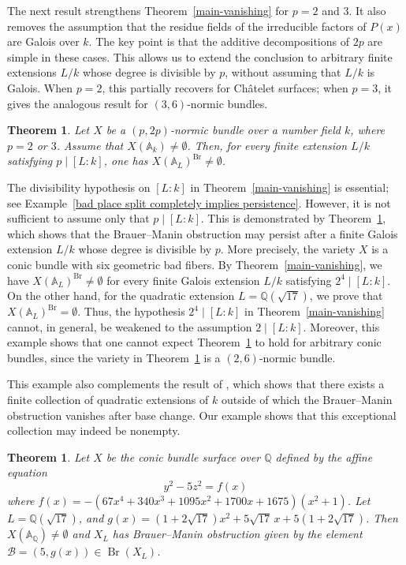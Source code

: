 \documentclass[10pt]{amsart}
\theoremstyle{plain}
\newtheorem{theorem}[thm]{Theorem}
\theoremstyle{definition}
\newcommand{\A}{{\mathbb A}}
\newcommand{\Q}{{\mathbb Q}}
\newcommand{\Br}{\operatorname{Br}}
\begin{document}
The next result strengthens Theorem~\ref{main-vanishing} for \(p=2\) and \(3\).
It also removes the assumption that the residue fields of the irreducible
factors of \(P(x)\) are Galois over \(k\). The key point is that the additive
decompositions of \(2p\) are simple in these cases. This allows us
to extend the conclusion to arbitrary finite extensions \(L/k\) whose degree is
divisible by \(p\), without assuming that \(L/k\) is Galois. When \(p=2\), this
partially recovers \cite[Theorem~1.1]{RW} for Châtelet surfaces; when \(p=3\),
it gives the analogous result for \((3,6)\)-normic bundles.
\begin{theorem}\label{3-6}
Let \(X\) be a \((p,2p)\)-normic bundle over a number field \(k\), where
\(p=2\) or \(3\). Assume that \(X(\A_k)\neq\emptyset\). Then, for every finite
extension \(L/k\) satisfying \(p\mid [L:k]\), one has
\(X(\A_L)^{\Br}\neq\emptyset\).
\end{theorem}

The divisibility hypothesis on \([L:k]\) in Theorem~\ref{main-vanishing} is essential; see Example~\ref{bad place split completely implies persistence}. However, it is not sufficient to assume only that \(p\mid [L:k]\). This is demonstrated by Theorem~\ref{Conic bundle BM}, which shows that the Brauer--Manin obstruction may persist after a finite Galois extension $L/k$ whose degree is divisible by $p$. More precisely, the variety \(X\) is a conic bundle with six geometric bad fibers. By Theorem~\ref{main-vanishing}, we have \(X(\mathbb{A}_L)^{\Br}\neq\emptyset\) for every finite Galois extension \(L/k\) satisfying \(2^4\mid [L:k]\). On the other hand, for the quadratic extension \(L=\Q(\sqrt{17})\), we prove that \(X(\mathbb{A}_L)^{\Br}=\emptyset\). Thus, the hypothesis \(2^4\mid [L:k]\) in Theorem~\ref{main-vanishing} cannot, in general, be weakened to the assumption \(2\mid [L:k]\). Moreover, this example shows that one cannot expect Theorem~\ref{3-6} to hold for arbitrary conic bundles, since the variety in Theorem~\ref{Conic bundle BM} is a \((2,6)\)-normic bundle.

This example also complements the result of \cite[Theorem~1.2]{RW}, which shows that there exists a finite collection of quadratic extensions of $k$ outside of which the Brauer--Manin obstruction vanishes after base change. Our example shows that this exceptional collection may indeed be nonempty.

\begin{theorem}\label{Conic bundle BM}
Let $X$ be the conic bundle surface over $\mathbb{Q}$ defined by the affine equation \[y^2-5z^2=f(x)\] where $ f(x) = -(67x^4 + 340x^3 + 1095x^2 + 1700x + 1675)(x^2 + 1) $. Let $L=\mathbb{Q}(\sqrt{17})$, and
\(
g(x)
=(1+2\sqrt{17})x^2
+5\sqrt{17}\,x
+5(1+2\sqrt{17})\). Then $X(\mathbb{A}_{\mathbb{Q}})\neq\emptyset$ and $X_L$ has Brauer--Manin obstruction given by the element $\mathcal{B}=(5,g(x))\in\operatorname{Br}(X_L)$.
\end{theorem}
\end{document}
